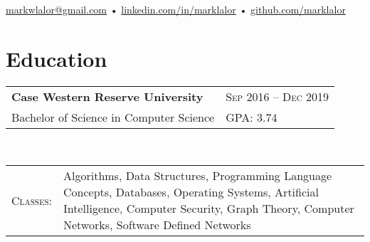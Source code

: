 \documentclass[a4paper,11pt]{article}
\begin{document}
\pagestyle{empty} %

\par{\par}
\begin{center}
\href{mailto:markwlalor@gmail.com}{markwlalor@gmail.com} • \href{https://linkedin.com/in/marklalor/}{linkedin.com/in/marklalor} • \href{http://github.com/marklalor}{github.com/marklalor}
\end{center}


\section{Education}
\begin{tabular}{lp{15cm}}
\textbf{Case Western Reserve University} & \textsc{Sep} 2016 -- \textsc{Dec} 2019 \\
Bachelor of Science in Computer Science &  \textsc{GPA}: 3.74\\
\end{tabular} \\
\begin{tabular}{rp{16cm}}
\textsc{Classes}: & \footnotesize{Algorithms, Data Structures, Programming Language Concepts, Databases, Operating Systems, Artificial Intelligence,  Computer Security, Graph Theory, Computer Networks, Software Defined Networks}
\end{tabular}
\end{document}

